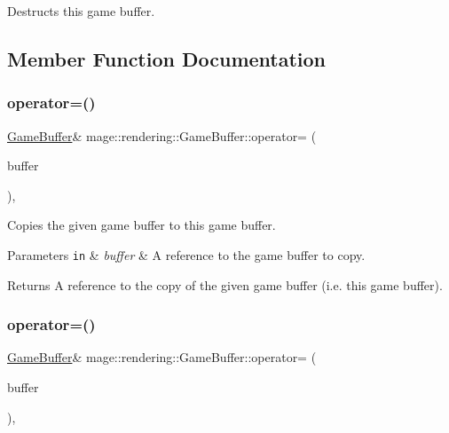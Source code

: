 Destructs this game buffer. 

\subsection{Member Function Documentation}
\hypertarget{structmage_1_1rendering_1_1_game_buffer_a44db86bb85f9fcf7dea1345ed9416aa3}{}\label{structmage_1_1rendering_1_1_game_buffer_a44db86bb85f9fcf7dea1345ed9416aa3} 
\subsubsection{\texorpdfstring{operator=()}{operator=()}\hspace{0.1cm}{\footnotesize\ttfamily [1/2]}}
{\footnotesize\ttfamily \hyperlink{structmage_1_1rendering_1_1_game_buffer}{Game\+Buffer}\& mage\+::rendering\+::\+Game\+Buffer\+::operator= (\begin{DoxyParamCaption}\item[{const \hyperlink{structmage_1_1rendering_1_1_game_buffer}{Game\+Buffer} \&}]{buffer }\end{DoxyParamCaption})\hspace{0.3cm}{\ttfamily [default]}, {\ttfamily [noexcept]}}

Copies the given game buffer to this game buffer.


\begin{DoxyParams}[1]{Parameters}
\mbox{\tt in}  & {\em buffer} & A reference to the game buffer to copy. \\
\hline
\end{DoxyParams}
\begin{DoxyReturn}{Returns}
A reference to the copy of the given game buffer (i.\+e. this game buffer). 
\end{DoxyReturn}
\hypertarget{structmage_1_1rendering_1_1_game_buffer_a3fec557a6d2f02eaf2082caa59b5e310}{}\label{structmage_1_1rendering_1_1_game_buffer_a3fec557a6d2f02eaf2082caa59b5e310} 
\subsubsection{\texorpdfstring{operator=()}{operator=()}\hspace{0.1cm}{\footnotesize\ttfamily [2/2]}}
{\footnotesize\ttfamily \hyperlink{structmage_1_1rendering_1_1_game_buffer}{Game\+Buffer}\& mage\+::rendering\+::\+Game\+Buffer\+::operator= (\begin{DoxyParamCaption}\item[{\hyperlink{structmage_1_1rendering_1_1_game_buffer}{Game\+Buffer} \&\&}]{buffer }\end{DoxyParamCaption})\hspace{0.3cm}{\ttfamily [default]}, {\ttfamily [noexcept]}}


